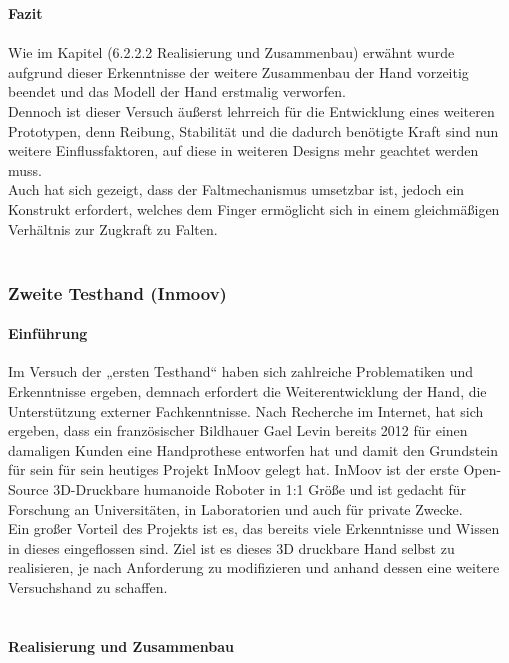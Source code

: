 \documentclass[titlepage,12pt,twoside]{article}
\begin{document}
\textbf{Fazit} \\
\\
Wie im Kapitel (6.2.2.2 Realisierung und Zusammenbau) erwähnt wurde aufgrund 
dieser Erkenntnisse der weitere Zusammenbau der Hand vorzeitig beendet und das 
Modell der Hand erstmalig verworfen. \\
Dennoch ist dieser Versuch äußerst lehrreich für die Entwicklung eines weiteren 
Prototypen, denn Reibung, Stabilität und die dadurch benötigte Kraft sind nun 
weitere Einflussfaktoren, auf diese in weiteren Designs mehr geachtet werden 
muss. \\
Auch hat sich gezeigt, dass der Faltmechanismus umsetzbar ist, jedoch ein Konstrukt 
erfordert, welches dem Finger ermöglicht sich in einem gleichmäßigen Verhältnis 
zur Zugkraft zu Falten. \\
\\

\subsubsection{Zweite Testhand (Inmoov)}
\paragraph{Einführung}
\hfill \break
\hfill \break
Im Versuch der „ersten Testhand“ haben sich zahlreiche Problematiken und 
Erkenntnisse ergeben, demnach erfordert die Weiterentwicklung der Hand, 
die Unterstützung externer Fachkenntnisse.
Nach Recherche im Internet, hat sich ergeben, dass ein französischer 
Bildhauer Gael Levin bereits 2012 für einen damaligen Kunden eine Handprothese 
entworfen hat und damit den Grundstein für sein für sein heutiges Projekt 
InMoov gelegt hat. InMoov ist der erste Open-Source 3D-Druckbare humanoide 
Roboter in 1:1 Größe und ist gedacht für Forschung an Universitäten, in 
Laboratorien und auch für private Zwecke. \\
Ein großer Vorteil des Projekts ist es, das bereits viele Erkenntnisse und 
Wissen in dieses eingeflossen sind. Ziel ist es dieses 3D druckbare Hand 
selbst zu realisieren, je nach Anforderung zu modifizieren und anhand dessen 
eine weitere Versuchshand zu schaffen. \\
\\

\paragraph{Realisierung und Zusammenbau}
\hfill \break
\hfill \break
\end{document}
